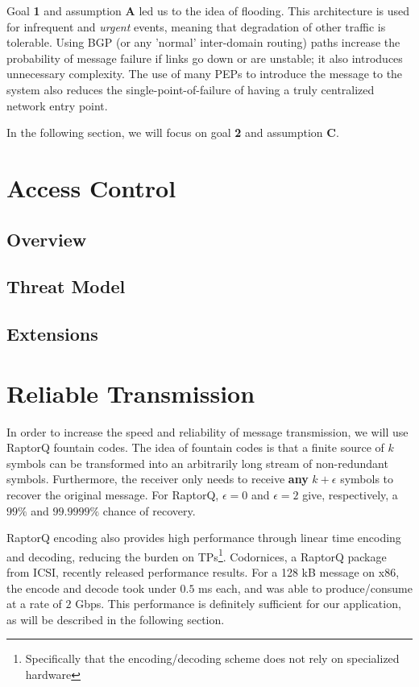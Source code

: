 Goal \textbf{1} and assumption \textbf{A} led us to the idea of flooding. This architecture is used for infrequent and \textit{urgent} events, meaning that degradation of other traffic is tolerable. Using BGP (or any 'normal' inter-domain routing) paths increase the probability of message failure if links go down or are unstable; it also introduces unnecessary complexity. The use of many PEPs to introduce the message to the system also reduces the single-point-of-failure of having a truly centralized network entry point.

In the following section, we will focus on goal \textbf{2} and assumption \textbf{C}. 
\section{Access Control}\label{acl}
\subsection{Overview}

\subsection{Threat Model}
\subsection{Extensions}
\section{Reliable Transmission}\label{reliable}
In order to increase the speed and reliability of message transmission, we will use RaptorQ fountain codes. The idea of fountain codes is that a finite source of $k$ symbols can be transformed into an arbitrarily long stream of non-redundant symbols. Furthermore, the receiver only needs to receive \textbf{any} $k + \epsilon$ symbols to recover the original message. For RaptorQ, $\epsilon = 0$ and $\epsilon = 2$ give, respectively, a $99\%$ and $99.9999\%$ chance of recovery\cite{raptorq, raptorqpresent}.

RaptorQ encoding also provides high performance through linear time encoding and decoding, reducing the burden on TPs\footnote{Specifically that the encoding/decoding scheme does not rely on specialized hardware}. Codornices, a RaptorQ package from ICSI, recently released performance results. For a 128 kB message on x86, the encode and decode took under $0.5$ ms each, and was able to produce/consume at a rate of $2$ Gbps\cite{raptorqperf}. This performance is definitely sufficient for our application, as will be described in the following section.
